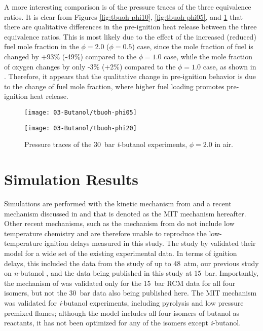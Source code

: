 \documentclass[12pt, letterpaper]{article}
\begin{document}
A more interesting comparison is of the pressure traces of the three
equivalence ratios. It is clear from Figures \ref{fig:tbuoh-phi10},
\ref{fig:tbuoh-phi05}, and \ref{fig:tbuoh-phi20} that there are qualitative
differences in the pre-ignition heat release between the three equivalence
ratios. This is most likely due to the effect of the increased (reduced) fuel
mole fraction in the $\phi=\num{2.0}$ ($\phi=\num{0.5}$) case, since the mole fraction of
fuel is changed by +93\% (-49\%) compared to the $\phi=\num{1.0}$ case, while the
mole fraction of oxygen changes by only -3\% (+2\%) compared to the $\phi=\num{1.0}$
case, as shown in . Therefore, it appears that the
qualitative change in pre-ignition behavior is due to the change of fuel mole
fraction, where higher fuel loading promotes pre-ignition heat release.

\begin{figure}
    \begin{floatrow}
    \ffigbox
        {\texttt{[image: 03-Butanol/tbuoh-phi05]}}
        {\caption{Pressure traces of the \SI{30}{\bar} \textit{t}-butanol experiments,
            $\phi=\num{0.5}$ in air.}
        \label{fig:tbuoh-phi05}}
    \ffigbox
        {\texttt{[image: 03-Butanol/tbuoh-phi20]}}
        {\caption{Pressure traces of the \SI{30}{\bar} \textit{t}-butanol experiments,
            $\phi=\num{2.0}$ in air.}
        \label{fig:tbuoh-phi20}}
    \end{floatrow}
\end{figure}

\section{Simulation Results}
\label{sec:buoh-sims}

Simulations are performed with the kinetic mechanism from
\textcite{Sarathy2012} and a recent mechanism discussed in
\textcite{Hansen2013} and \textcite{Merchant2013} that is denoted as the MIT
mechanism hereafter. Other recent mechanisms, such as the mechanism from
\textcite{Frassoldati2012} do not include low temperature chemistry and are
therefore unable to reproduce the low-temperature ignition delays measured in
this study. The study by \textcite{Sarathy2012} validated their model for a
wide set of the existing experimental data. In terms of ignition delays, this
included the data from the study of \textcite{Stranic2012} up to \SI{48}{atm}, our
previous study on \textit{n}-butanol \cite{Weber2011}, and the data being
published in this study at \SI{15}{\bar}. Importantly, the mechanism of
\textcite{Sarathy2012} was validated only for the \SI{15}{\bar} RCM data for all four
isomers, but not the \SI{30}{\bar} data also being published here. The MIT mechanism
\cite{Hansen2013,Merchant2013} was validated for \textit{i}-butanol
experiments, including pyrolysis and low pressure premixed flames; although the
model includes all four isomers of butanol as reactants, it has not been
optimized for any of the isomers except \textit{i}-butanol.
\end{document}
